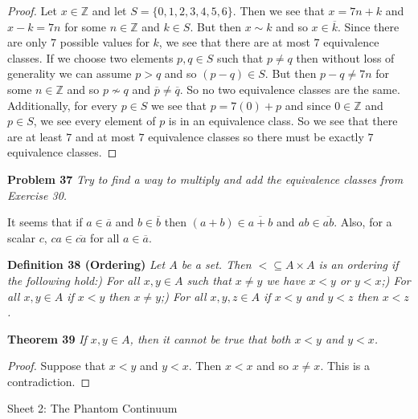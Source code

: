 \documentclass{article}
\begin{document}
\begin{flushleft}
\begin{proof}
Let $x \in \mathbb{Z}$ and let $S = \{0,1,2,3,4,5,6\}$. Then we see that $x = 7n+k$ and $x-k=7n$ for some $n \in \mathbb{Z}$ and $k \in S$. But then $x \sim k$ and so $x \in \overline{k}$. Since there are only $7$ possible values for $k$, we see that there are at most $7$ equivalence classes. If we choose two elements $p,q \in S$ such that $p \neq q$ then without loss of generality we can assume $p>q$ and so $(p-q) \in S$. But then $p-q \neq 7n$ for some $n \in \mathbb{Z}$ and so $p \nsim q$ and $\overline{p} \neq \overline{q}$. So no two equivalence classes are the same. Additionally, for every $p \in S$ we see that $p = 7(0) + p$ and since $0 \in \mathbb{Z}$ and $p \in S$, we see every element of $p$ is in an equivalence class. So we see that there are at least $7$ and at most $7$ equivalence classes so there must be exactly $7$ equivalence classes.
\end{proof}

\textbf{Problem 37}
\textsl{Try to find a way to multiply and add the equivalence classes from Exercise 30.}\newline

It seems that if $a \in \overline{a}$ and $b \in \overline{b}$ then $(a+b) \in \overline{a+b}$ and $ab \in \overline{ab}$. Also, for a scalar $c$, $ca \in \overline{ca}$ for all $a \in \overline{a}$.\newline

\textbf{Definition 38 (Ordering)}
\textsl{Let $A$ be a set. Then $< \subseteq A \times A$ is an ordering if the following hold:) For all $x,y \in A$ such that $x \neq y$ we have $x < y$ or $y < x$;) For all $x,y \in A$ if $x < y$ then $x \neq y$;) For all $x,y,z \in A$ if $x < y$ and $y < z$ then $x < z$.}\newline

\textbf{Theorem 39}
\textsl{If $x,y \in A$, then it cannot be true that both $x < y$ and $y < x$.}
\begin{proof}
Suppose that $x<y$ and $y<x$. Then $x<x$ and so $x \neq x$. This is a contradiction.
\end{proof}
\newpage

\Large

Sheet 2: The Phantom Continuum\newline

\normalsize


\end{flushleft}
\end{document}
